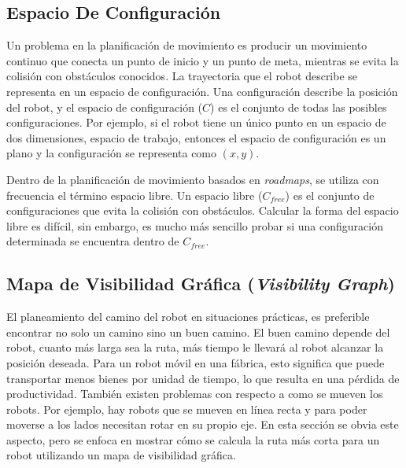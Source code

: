 \subsection{Espacio De Configuraci\'on}

Un problema en la planificaci\'on de movimiento es producir un movimiento 
continuo que conecta un punto de inicio y un punto de meta, mientras se evita 
la colisi\'on con obst\'aculos conocidos. La trayectoria que el robot describe 
se representa en un espacio de configuraci\'on. Una configuraci\'on describe 
la posici\'on del robot, y el espacio de configuraci\'on ($C$) es el conjunto 
de todas las posibles configuraciones. Por ejemplo, si el robot tiene 
un \'unico punto en un espacio de dos dimensiones, espacio de trabajo, entonces 
el espacio de configuraci\'on es un plano y la configuraci\'on se representa 
como $(x,y)$.

Dentro de la planificaci\'on de movimiento basados en \textit{roadmaps}, se 
utiliza con frecuencia el t\'ermino espacio libre. Un espacio libre ($C_{free}$) 
es el conjunto de configuraciones que evita la colisi\'on con obst\'aculos. Calcular 
la forma del espacio libre es dif\'icil, sin embargo, es mucho m\'as sencillo 
probar si una configuraci\'on determinada se encuentra dentro de $C_{free}$. 

\subsection{Mapa de Visibilidad Gr\'afica (\textit{Visibility Graph})}

El planeamiento del camino del robot en situaciones pr\'acticas, es preferible 
encontrar no solo un camino sino un buen camino. El buen camino depende del 
robot, cuanto m\'as larga sea la ruta, m\'as tiempo le llevar\'a al robot 
alcanzar la posici\'on deseada. Para un robot m\'ovil en una f\'abrica, esto 
significa que puede transportar menos bienes por unidad de tiempo, lo que 
resulta en una p\'erdida de productividad. Tambi\'en existen problemas con 
respecto a como se mueven los robots. Por ejemplo, hay robots que se mueven 
en l\'inea recta y para poder moverse a los lados necesitan rotar en su 
propio eje. En esta secci\'on se obvia este aspecto, pero se enfoca en 
mostrar c\'omo se calcula la ruta m\'as corta para un robot utilizando 
un mapa de visibilidad gr\'afica.


